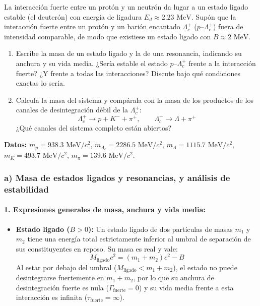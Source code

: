 \begin{problema}
La interacción fuerte entre un protón y un neutrón da lugar a un estado ligado estable (el deuterón) con energía de ligadura $E_d \approx 2.23\text{ MeV}$. Supón que la interacción fuerte entre un protón y un barión encantado $\Lambda_c^+$ ($p$--$\Lambda_c^+$) fuera de intensidad comparable, de modo que existiese un estado ligado con $B \approx 2\text{ MeV}$.

\begin{enumerate}[label=\alph*)]
    \item Escribe la masa de un estado ligado y la de una resonancia, indicando su anchura y su vida media. ¿Sería estable el estado $p$--$\Lambda_c^+$ frente a la interacción fuerte? ¿Y frente a todas las interacciones? Discute bajo qué condiciones exactas lo sería.
    \item Calcula la masa del sistema y compárala con la masa de los productos de los canales de desintegración débil de la $\Lambda_c^+$:
    \begin{equation*}
    \Lambda_c^+ \longrightarrow p + K^- + \pi^+, \qquad \Lambda_c^+ \longrightarrow \Lambda + \pi^+
    \end{equation*}
    ¿Qué canales del sistema completo están abiertos?
\end{enumerate}

\textbf{Datos:} $m_p = 938.3\text{ MeV}/c^2$, $m_{\Lambda_c} = 2286.5\text{ MeV}/c^2$, $m_\Lambda = 1115.7\text{ MeV}/c^2$, $m_K = 493.7\text{ MeV}/c^2$, $m_\pi = 139.6\text{ MeV}/c^2$.

\tcblower

\subsubsection*{a) Masa de estados ligados y resonancias, y análisis de estabilidad}

\paragraph{1. Expresiones generales de masa, anchura y vida media:}
\begin{itemize}
    \item \textbf{Estado ligado ($B > 0$):} Un estado ligado de dos partículas de masas $m_1$ y $m_2$ tiene una energía total estrictamente inferior al umbral de separación de sus constituyentes en reposo. Su masa es real y vale:
    \begin{equation*}
    M_{\text{ligado}} c^2 = (m_1 + m_2) c^2 - B
    \end{equation*}
    Al estar por debajo del umbral ($M_{\text{ligado}} < m_1 + m_2$), el estado no puede desintegrarse fuertemente en $m_1 + m_2$, por lo que su anchura de desintegración fuerte es nula ($\Gamma_{\text{fuerte}} = 0$) y su vida media frente a esta interacción es infinita ($\tau_{\text{fuerte}} = \infty$).


\end{itemize}
\end{problema}
